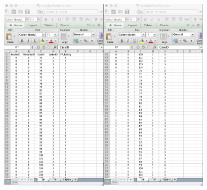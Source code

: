 \documentclass[]{book}
\begin{document}
\includegraphics[width=0.4\textwidth,height=\textheight]{images/ROC-TP-1.png}\includegraphics[width=0.4\textwidth,height=\textheight]{images/ROC-TP-2.png}
\end{document}
